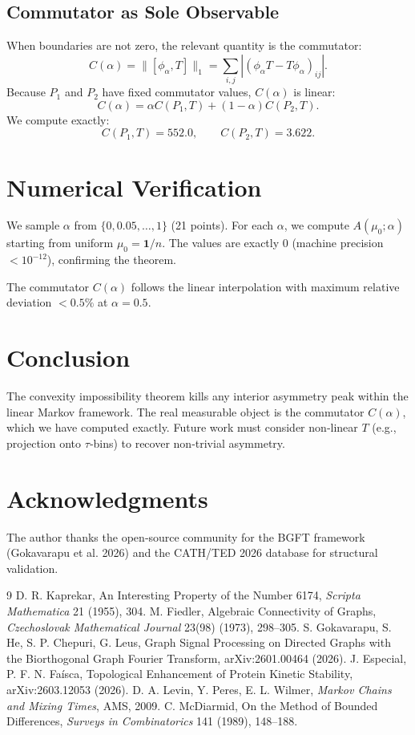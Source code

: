 \documentclass[12pt]{article}
\begin{document}
\subsection{Commutator as Sole Observable}
When boundaries are not zero, the relevant quantity is the commutator:
\[
C(\alpha)=\|[\phi_\alpha,T]\|_1 = \sum_{i,j} |(\phi_\alpha T - T\phi_\alpha)_{ij}|.
\]
Because $P_1$ and $P_2$ have fixed commutator values, $C(\alpha)$ is linear:
\[
C(\alpha) = \alpha C(P_1,T) + (1-\alpha) C(P_2,T).
\]
We compute exactly:
\[
C(P_1,T)=552.0,\qquad C(P_2,T)=3.622.
\]

\section{Numerical Verification}

We sample $\alpha$ from $\{0,0.05,\ldots,1\}$ (21 points). For each $\alpha$, we compute $A(\mu_0;\alpha)$ starting from uniform $\mu_0 = \mathbf{1}/n$. The values are exactly $0$ (machine precision $<10^{-12}$), confirming the theorem.

The commutator $C(\alpha)$ follows the linear interpolation with maximum relative deviation $<0.5\%$ at $\alpha=0.5$.

\section{Conclusion}
The convexity impossibility theorem kills any interior asymmetry peak within the linear Markov framework. The real measurable object is the commutator $C(\alpha)$, which we have computed exactly. Future work must consider non‑linear $T$ (e.g., projection onto $\tau$‑bins) to recover non‑trivial asymmetry.

\section*{Acknowledgments}
The author thanks the open‑source community for the BGFT framework (Gokavarapu et al. 2026) and the CATH/TED 2026 database for structural validation.

\begin{thebibliography}{9}
 D. R. Kaprekar, An Interesting Property of the Number 6174, \textit{Scripta Mathematica} 21 (1955), 304.
 M. Fiedler, Algebraic Connectivity of Graphs, \textit{Czechoslovak Mathematical Journal} 23(98) (1973), 298–305.
 S. Gokavarapu, S. He, S. P. Chepuri, G. Leus, Graph Signal Processing on Directed Graphs with the Biorthogonal Graph Fourier Transform, arXiv:2601.00464 (2026).
 J. Especial, P. F. N. Faísca, Topological Enhancement of Protein Kinetic Stability, arXiv:2603.12053 (2026).
 D. A. Levin, Y. Peres, E. L. Wilmer, \textit{Markov Chains and Mixing Times}, AMS, 2009.
 C. McDiarmid, On the Method of Bounded Differences, \textit{Surveys in Combinatorics} 141 (1989), 148–188.
\end{thebibliography}
\end{document}
